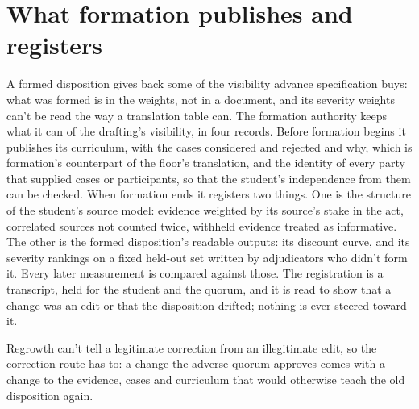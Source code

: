 \section{What formation publishes and registers}
\label{sec:28.9}
A formed disposition gives back some of the visibility advance specification buys: what was formed is in the weights, not in a document, and its severity weights can't be read the way a translation table can. The formation authority keeps what it can of the drafting's visibility, in four records. Before formation begins it publishes its curriculum, with the cases considered and rejected and why, which is formation's counterpart of the floor's translation, and the identity of every party that supplied cases or participants, so that the student's independence from them can be checked. When formation ends it registers two things. One is the structure of the student's source model: evidence weighted by its source's stake in the act, correlated sources not counted twice, withheld evidence treated as informative. The other is the formed disposition's readable outputs: its discount curve, and its severity rankings on a fixed held-out set written by adjudicators who didn't form it. Every later measurement is compared against those. The registration is a transcript, held for the student and the quorum, and it is read to show that a change was an edit or that the disposition drifted; nothing is ever steered toward it.

Regrowth can't tell a legitimate correction from an illegitimate edit, so the correction route has to: a change the adverse quorum approves comes with a change to the evidence, cases and curriculum that would otherwise teach the old disposition again.
